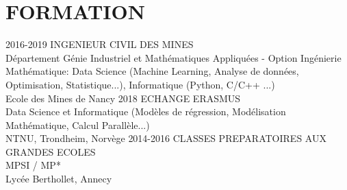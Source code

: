 \documentclass[]{cv-style}          %
\begin{document}
\section{FORMATION}
%
\begin{entrylist}
\entry
{2016-2019}
{INGENIEUR CIVIL DES MINES\\
{\normalfont 
    Département Génie Industriel et Mathématiques Appliquées - Option Ingénierie Mathématique: Data Science (Machine Learning, Analyse de données, Optimisation, Statistique...), Informatique (Python, C/C++ ...) \\
}}
{\vspace{-0.4cm}}
{ \small Ecole des Mines de Nancy}
\entry
{2018}
{ECHANGE ERASMUS \\{\normalfont 
	   Data Science et Informatique (Modèles de régression, Modélisation Mathématique, Calcul Parallèle...) \\
}}
{\vspace{-0.4cm}}
{ \small NTNU, Trondheim, Norvège}
\entry
{2014-2016}
{%
    CLASSES PREPARATOIRES AUX GRANDES ECOLES \\{\normalfont MPSI / MP* \\}
}
{\vspace{-0.4cm}}
{ \small Lycée Berthollet, Annecy}
\end{entrylist}
\end{document}
